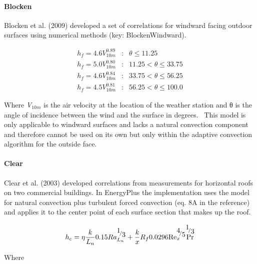 \paragraph{Blocken}\label{blocken}

Blocken et al. (2009) developed a set of correlations for windward facing outdoor surfaces using numerical methods (key: BlockenWindward).

\begin{equation}
\begin{array}{lcl}
    h_f = 4.6V^{0.89}_{10m} & : & \theta \leq 11.25 \\
    h_f = 5.0V^{0.80}_{10m} & : & 11.25 < \theta \leq 33.75 \\
    h_f = 4.6V^{0.84}_{10m} & : & 33.75 < \theta \leq 56.25 \\
    h_f = 4.5V^{0.81}_{10m} & : & 56.25 < \theta \leq 100.0
\end{array}
\end{equation}

Where \emph{V\(_{10m}\)} is the air velocity at the location of the weather station and θ is the angle of incidence between the wind and the surface in degrees.~ This model is only applicable to windward surfaces and lacks a natural convection component and therefore cannot be used on its own but only within the adaptive convection algorithm for the outside face.

\paragraph{Clear}\label{clear}

Clear et al. (2003) developed correlations from measurements for horizontal roofs on two commercial buildings. In EnergyPlus the implementation uses the model for natural convection plus turbulent forced convection (eq. 8A in the reference) and applies it to the center point of each surface section that makes up the roof.

\begin{equation}
{h_c} = \eta \frac{k}{{{L_n}}}0.15Ra_{{L_n}}^{{\raise0.7ex\hbox{1} \!\mathord{\left/ {\vphantom {1 3}}\right.}\!\lower0.7ex\hbox{3}}} + \frac{k}{x}{R_f}0.0296{\mathop{\rm Re}\nolimits}_x^{{\raise0.7ex\hbox{4} \!\mathord{\left/ {\vphantom {4 5}}\right.}\!\lower0.7ex\hbox{5}}}{\Pr ^{{\raise0.7ex\hbox{1} \!\mathord{\left/ {\vphantom {1 3}}\right.}\!\lower0.7ex\hbox{3}}}}
\end{equation}

Where

